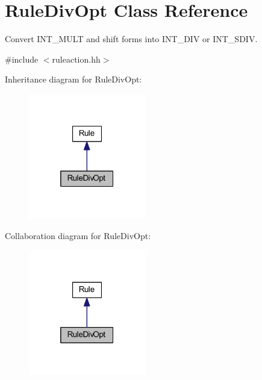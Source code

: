 \hypertarget{class_rule_div_opt}{}\section{Rule\+Div\+Opt Class Reference}
\label{class_rule_div_opt}


Convert I\+N\+T\+\_\+\+M\+U\+LT and shift forms into I\+N\+T\+\_\+\+D\+IV or I\+N\+T\+\_\+\+S\+D\+IV.  




{\ttfamily \#include $<$ruleaction.\+hh$>$}



Inheritance diagram for Rule\+Div\+Opt\+:
\nopagebreak
\begin{figure}[H]
\begin{center}
\leavevmode
\includegraphics[width=145pt]{class_rule_div_opt__inherit__graph}
\end{center}
\end{figure}


Collaboration diagram for Rule\+Div\+Opt\+:
\nopagebreak
\begin{figure}[H]
\begin{center}
\leavevmode
\includegraphics[width=145pt]{class_rule_div_opt__coll__graph}
\end{center}
\end{figure}
